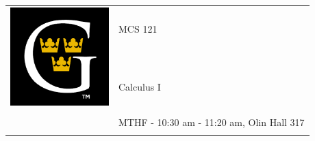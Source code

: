 \documentclass[11pt]{article}
\begin{document}
\begin{tabular}{ l l }
 \multirow{3}{*}{\includegraphics[height=1.5in,width=1.5in]{GAC_logo.png}} & \LARGE MCS 121 \\\\
  & \LARGE  Calculus I \\\\
  & \LARGE MTHF - 10:30 am - 11:20 am, Olin Hall 317 \\\\
\end{tabular}
\vspace{10mm}
\end{document}

